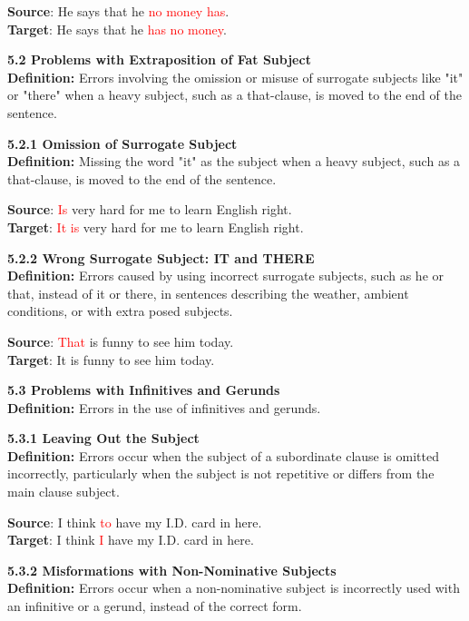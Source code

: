 \begin{tcolorbox}[breakable]
\textbf{Source}: He says that he \textcolor{red}{no money has}. \\
\textbf{Target}: He says that he \textcolor{red}{has no money}.


\noindent \textbf{5.2 Problems with Extraposition of Fat Subject}\\
\textbf{Definition:} Errors involving the omission or misuse of surrogate subjects like "it" or "there" when a heavy subject, such as a that-clause, is moved to the end of the sentence.

\noindent \textbf{5.2.1 Omission of Surrogate Subject}\\
\textbf{Definition:} Missing the word "it" as the subject when a heavy subject, such as a that-clause, is moved to the end of the sentence.


\textbf{Source}: \textcolor{red}{Is} very hard for me to learn English right. \\
\textbf{Target}: \textcolor{red}{It is} very hard for me to learn English right.


\noindent \textbf{5.2.2 Wrong Surrogate Subject: IT and THERE}\\
\textbf{Definition:} Errors caused by using incorrect surrogate subjects, such as he or that, instead of it or there, in sentences describing the weather, ambient conditions, or with extra posed subjects.


\textbf{Source}: \textcolor{red}{That} is funny to see him today. \\
\textbf{Target}: It is funny to see him today.


\noindent \textbf{5.3 Problems with Infinitives and Gerunds}\\
\textbf{Definition:} Errors in the use of infinitives and gerunds.

\noindent \textbf{5.3.1 Leaving Out the Subject}\\
\textbf{Definition:} Errors occur when the subject of a subordinate clause is omitted incorrectly, particularly when the subject is not repetitive or differs from the main clause subject.


\textbf{Source}: I think \textcolor{red}{to} have my I.D. card in here. \\
\textbf{Target}: I think \textcolor{red}{I} have my I.D. card in here.


\noindent \textbf{5.3.2 Misformations with Non-Nominative Subjects}\\
\textbf{Definition:} Errors occur when a non-nominative subject is incorrectly used with an infinitive or a gerund, instead of the correct form.



\end{tcolorbox}
